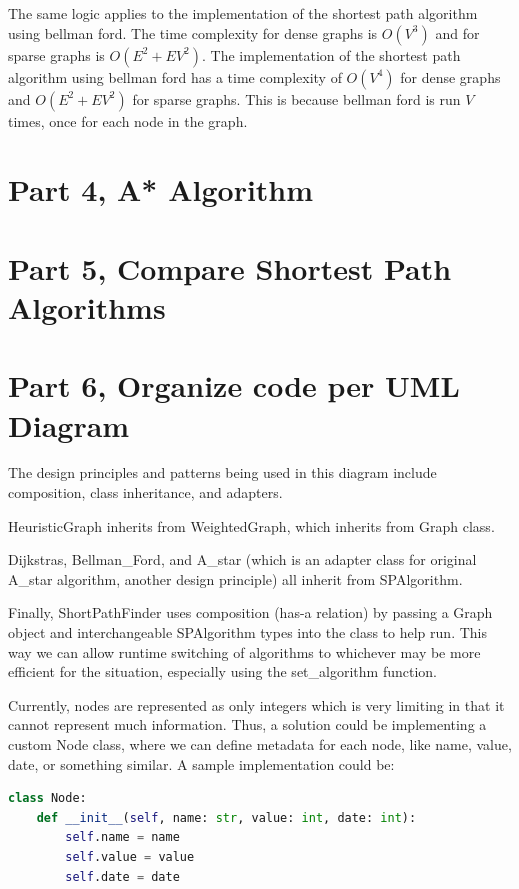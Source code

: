 \documentclass{article}
\begin{document}
\begin{onehalfspace}
\smallskip
The same logic applies to the implementation of the shortest path algorithm using bellman ford. The time complexity for dense graphs is $O(V^3)$ and for sparse graphs is $O(E^2 + EV^2)$.
The implementation of the shortest path algorithm using bellman ford has a time complexity of $O(V^4)$ for dense graphs and $O(E^2 + EV^2)$ for sparse graphs. This is because bellman ford is run $V$ times, once for each node in the graph.


\section*{Part 4, A* Algorithm}
\newpage

\section*{Part 5, Compare Shortest Path Algorithms}
\newpage

\section*{Part 6, Organize code per UML Diagram}

The design principles and patterns being used in this diagram include composition, class inheritance, and adapters. 

HeuristicGraph inherits from WeightedGraph, which inherits from Graph class.

Dijkstras, Bellman\_Ford, and A\_star (which is an adapter class for original A\_star algorithm, another design principle) all inherit from SPAlgorithm.

Finally, ShortPathFinder uses composition (has-a relation) by passing a Graph object and interchangeable SPAlgorithm types into the class to help run. This way we can allow runtime switching of algorithms to whichever may be more efficient for the situation, especially using the set\_algorithm function.

Currently, nodes are represented as only integers which is very limiting in that it cannot represent much information. Thus, a solution could be implementing a custom Node class, where we can define metadata for each node, like name, value, date, or something similar. A sample implementation could be:

\begin{lstlisting}[language=Python]
class Node:
    def __init__(self, name: str, value: int, date: int):
        self.name = name
        self.value = value
        self.date = date


\end{lstlisting}
\end{onehalfspace}
\end{document}
